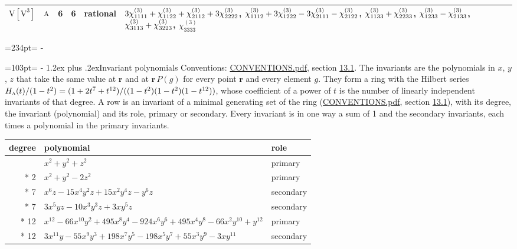 \documentclass[10pt,a4paper]{article}
\makeatletter
\renewcommand\section{\@startsection{section}{1}{\z@}{-3ex plus -1ex minus -.2ex}%
  {1.2ex plus .2ex}{\normalfont\large\sffamily\bfseries\color{parttitle}}}
\newcommand{\needspace}[1]{\par\penalty-100\begingroup\dimen0=#1\relax\dimen2=\pagegoal
  \advance\dimen2-\pagetotal\ifdim\dimen0>\dimen2\relax\ifdim\dimen2>0pt\vfil\break\fi\fi
  \endgroup}
\numberwithin{equation}{section}
\newcommand{\irr}[1]{\text{\normalfont\scshape #1}}
\newcommand{\pointr}{\mathbf{r}}
\newcommand{\jahn}[1]{\mathrm{#1}}
\newlength{\fillwidth}\newlength{\cellwidth}\newlength{\colwidth}
\newcommand{\signbreak}{\penalty100\relax}
\makeatother
\begin{document}
{\begin{longtable}{@{}llrrl>{\RaggedRight\arraybackslash}p{\fillwidth}@{}}
$\jahn{V[V^{3}]}$ & $\irr{a}$ & 6 & 6 & rational & $3\chi^{(3)}_{1111} +\signbreak \chi^{(3)}_{1122} +\signbreak \chi^{(3)}_{2112} +\signbreak 3\chi^{(3)}_{2222}$, $\chi^{(3)}_{1112} +\signbreak 3\chi^{(3)}_{1222} -\signbreak 3\chi^{(3)}_{2111} -\signbreak \chi^{(3)}_{2122}$, $\chi^{(3)}_{1133} +\signbreak \chi^{(3)}_{2233}$, $\chi^{(3)}_{1233} -\signbreak \chi^{(3)}_{2133}$, $\chi^{(3)}_{3113} +\signbreak \chi^{(3)}_{3223}$, $\chi^{(3)}_{3333}$\\
\bottomrule\end{longtable}}
\needspace{234pt}
\needspace{103pt}
\section{Invariant polynomials}\label{s:invariant_polynomials}
Conventions: \href{../../CONVENTIONS.pdf}{CONVENTIONS.pdf}, section \href{../../CONVENTIONS.pdf\#conv.13.1}{13.1}.
The invariants are the polynomials in $x$, $y$, $z$ that take the same value at $\pointr$ and at $\pointr\,P(g)$ for every point $\pointr$ and every element $g$. They form a ring with the Hilbert series $H_{\irr{a}}(t)/(1-t^{2}) = (1 + 2t^{7} + t^{12})/((1-t^{2})(1-t^{2})(1-t^{12}))$, whose coefficient of a power of $t$ is the number of linearly independent invariants of that degree. \label{n:head.degree}\label{n:head.role}A row is an invariant of a minimal generating set of the ring (\href{../../CONVENTIONS.pdf}{CONVENTIONS.pdf}, section \href{../../CONVENTIONS.pdf\#conv.13.1}{13.1}), with its degree, the invariant (polynomial) and its role, primary or secondary. Every invariant is in one way a sum of 1 and the secondary invariants, each times a polynomial in the primary invariants.
{\small\begin{longtable}{@{}rll@{}}\toprule
degree & polynomial & role\\\midrule\endhead
\bottomrule\endfoot\endlastfoot
2 & $x^{2} + y^{2} + z^{2}$ & primary\\*
2 & $x^{2} + y^{2} - 2z^{2}$ & primary\\*
7 & $x^{6}z - 15x^{4}y^{2}z + 15x^{2}y^{4}z - y^{6}z$ & secondary\\*
7 & $3x^{5}yz - 10x^{3}y^{3}z + 3xy^{5}z$ & secondary\\*
12 & $x^{12} - 66x^{10}y^{2} + 495x^{8}y^{4} - 924x^{6}y^{6} + 495x^{4}y^{8} - 66x^{2}y^{10} + y^{12}$ & primary\\*
12 & $3x^{11}y - 55x^{9}y^{3} + 198x^{7}y^{5} - 198x^{5}y^{7} + 55x^{3}y^{9} - 3xy^{11}$ & secondary\\
\bottomrule\end{longtable}}
\end{document}
